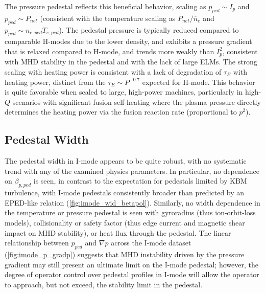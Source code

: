 \documentclass[ twoside,openright,titlepage,numbers=noenddot,headinclude,%
                footinclude=true,cleardoublepage=empty,abstractoff, %
                BCOR=5mm,paper=letter,fontsize=11pt,%
                ngerman,american,%
                ]{scrreprt}
\begin{document}
The pressure pedestal reflects this beneficial behavior, scaling as $p_{ped} \sim I_p$ and $p_{ped} \sim P_{net}$ (consistent with the temperature scaling as $P_{net}/\overline{n}_e$ and $p_{ped} \sim n_{e,ped} T_{e,ped}$).  The pedestal pressure is typically reduced compared to comparable H-modes due to the lower density, and exhibits a pressure gradient that is relaxed compared to H-mode, and trends more weakly than $I_p^2$, consistent with MHD stability in the pedestal and with the lack of large ELMs.  The strong scaling with heating power is consistent with a lack of degradation of $\tau_E$ with heating power, distinct from the $\tau_E \sim P^{-0.7}$ expected for H-mode.  This behavior is quite favorable when scaled to large, high-power machines, particularly in high-$Q$ scenarios with significant fusion self-heating where the plasma pressure directly determines the heating power via the fusion reaction rate (proportional to $p^2$).

\subsection*{Pedestal Width}

The pedestal width in I-mode appears to be quite robust, with no systematic trend with any of the examined physics parameters.  In particular, no dependence on $\beta_{p,ped}$ is seen, in contrast to the expectation for pedestals limited by KBM turbulence, with I-mode pedestals consistently broader than predicted by an EPED-like relation (\cref{fig:imode_wid_betapol}).  Similarly, no width dependence in the temperature or pressure pedestal is seen with gyroradius (thus ion-orbit-loss models), collisionality or safety factor (thus edge current and magnetic shear impact on MHD stability), or heat flux through the pedestal.  The linear relationship between $p_{ped}$ and $\nabla p$ across the I-mode dataset (\cref{fig:imode_p_gradp}) suggests that MHD instability driven by the pressure gradient may still present an ultimate limit on the I-mode pedestal; however, the degree of operator control over pedestal profiles in I-mode will allow the operator to approach, but not exceed, the stability limit  in the pedestal.
\end{document}

